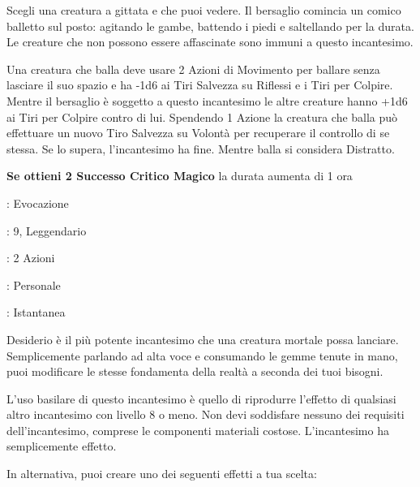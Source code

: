 \begin{multicols}{2}
Scegli una creatura a gittata e che puoi vedere. Il bersaglio comincia un comico balletto sul posto: agitando le gambe, battendo i piedi e saltellando per la durata. Le creature che non possono essere affascinate sono immuni a questo incantesimo.

Una creatura che balla deve usare 2 Azioni di Movimento per ballare senza lasciare il suo spazio e ha -1d6 ai Tiri Salvezza su Riflessi e i Tiri per Colpire. Mentre il bersaglio è soggetto a questo incantesimo le altre creature hanno +1d6 ai Tiri per Colpire contro di lui. Spendendo 1 Azione la creatura che balla può effettuare un nuovo Tiro Salvezza su Volontà per recuperare il controllo di se stessa. Se lo supera, l'incantesimo ha fine. Mentre balla si considera Distratto.

\textbf{Se ottieni 2 Successo Critico Magico} la durata aumenta di 1 ora

\noindent\colorbox{OBSSgold!10}{
\begin{minipage}{0.95\linewidth}
\begin{description}[noitemsep, topsep=0pt, parsep=0pt, partopsep=0pt, leftmargin=0cm, labelwidth=1.3cm]
	\item[\textbf{Lista}]: Evocazione
	\item[\textbf{Livello}]: 9, Leggendario
	\item[\textbf{Lancio}]: 2 Azioni
	\item[\textbf{Gittata}]: Personale
	\item[\textbf{Durata}]: Istantanea
\end{description}
\end{minipage}}\smallskip

Desiderio è il più potente incantesimo che una creatura mortale possa lanciare. Semplicemente parlando ad alta voce e consumando le gemme tenute in mano, puoi modificare le stesse fondamenta della realtà a seconda dei tuoi bisogni.

L'uso basilare di questo incantesimo è quello di riprodurre l'effetto di qualsiasi altro incantesimo con livello 8 o meno. Non devi soddisfare nessuno dei requisiti dell'incantesimo, comprese le componenti materiali costose. L'incantesimo ha semplicemente effetto.

In alternativa, puoi creare uno dei seguenti effetti a tua scelta:


\end{multicols}
